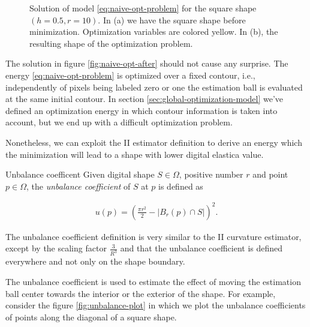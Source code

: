\begin{figure}
\caption{Solution of model \eqref{eq:naive-opt-problem} for the square shape $(h=0.5,r=10)$. In (a) we have the square shape before minimization. Optimization variables are colored yellow. In (b), the resulting shape of the optimization problem. }
\label{fig:naive-opt-problem}
\end{figure}

The solution in figure \ref{fig:naive-opt-after} should not cause any surprise. The energy \eqref{eq:naive-opt-problem} is optimized over a fixed contour, i.e., independently of pixels being labeled zero or one the estimation ball is evaluated at the same initial contour. In section \ref{sec:global-optimization-model} we've defined an optimization energy in which contour information is taken into account, but we end up with a difficult optimization problem.

Nonetheless, we can exploit the II estimator definition to derive an energy which the minimization will lead to a shape with lower digital elastica value.


\begin{definition}{Unbalance coefficent}
Given digital shape $S \in \Omega$, positive number $r$ and point $p \in \Omega$, the \emph{unbalance coefficient} of $S$ at $p$ is defined as

\begin{align*}
	u(p) = \left( \frac{\pi r^2}{2} - |B_r(p) \cap S| \right)^2.
\end{align*}

\end{definition}

The unbalance coefficient definition is very similar to the II curvature estimator, except by the scaling factor $\frac{3}{R^3}$ and that the unbalance coefficient is defined everywhere and not only on the shape boundary.

The unbalance coefficient is used to estimate the effect of moving the estimation ball center towards the interior or the exterior of the shape. For example, consider the figure \ref{fig:unbalance-plot} in which we plot the unbalance coefficients of points along the diagonal of a square shape. 

